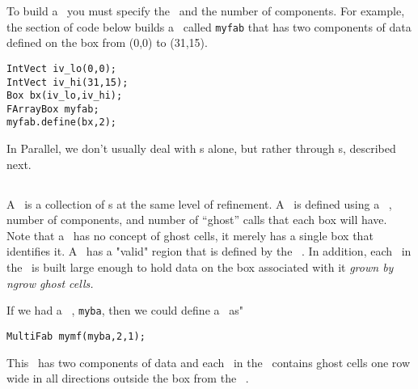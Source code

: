 To build a \FAB\ you must specify the \Boxtype\ and the number of components.
For example, the section of code below builds a \FAB\ called {\tt myfab}
that has two components of data defined on the box from (0,0) to (31,15).

\begin{verbatim}
IntVect iv_lo(0,0);
IntVect iv_hi(31,15);
Box bx(iv_lo,iv_hi);
FArrayBox myfab;
myfab.define(bx,2);
\end{verbatim}

In Parallel, we don't usually deal with \FAB s alone, but rather
through \MultiFab s, described next.

\subsection{\MultiFab}

A \MultiFab\ is a collection of \FAB s at the same level of
refinement.  A \MultiFab\ is defined using a \BoxArray\ ,
number of components, and number of ``ghost'' calls that each box
will have.  Note that a \FAB\ has no concept of ghost cells, it
merely has a single box that identifies it.  A \MultiFab\ has
a "valid" region that is defined by the \BoxArray\ .  In addition,
each \FAB\ in the \MultiFab\ is built large enough to hold data
on the box associated with it {\it grown by ngrow ghost cells.}

If we had a \BoxArray\ , {\tt myba}, then we could define a \MultiFab\
as"

\begin{verbatim}
MultiFab mymf(myba,2,1);
\end{verbatim}

This \MultiFab\ has two components of data and each \FAB\ in the \MultiFab\
contains ghost cells one row wide in all directions outside the box from the \BoxArray\ .

